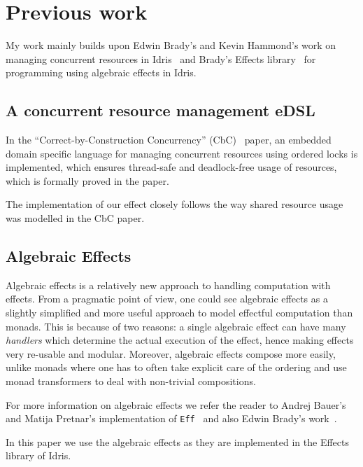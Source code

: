 \section{Previous work}

My work mainly builds upon Edwin Brady's and Kevin Hammond's work on managing
concurrent resources in Idris~\cite{cbconc-fi} and Brady's Effects
library~\cite{effects-idr} for programming using algebraic effects in Idris.

\subsection{A concurrent resource management eDSL}

In the ``Correct-by-Construction Concurrency'' (CbC)~\cite{cbconc-fi} paper, an
embedded domain specific language for managing concurrent resources using
ordered locks is implemented, which ensures thread-safe and deadlock-free usage
of resources, which is formally proved in the paper.

The implementation of our effect closely follows the way shared resource usage
was modelled in the CbC paper.

\subsection{Algebraic Effects}

Algebraic effects is a relatively new approach to handling computation with
effects. From a pragmatic point of view, one could see algebraic effects as a
slightly simplified and more useful approach to model effectful computation than
monads. This is because of two reasons: a single algebraic effect can have many
\emph{handlers} which determine the actual execution of the effect, hence
making effects very re-usable and modular. Moreover, algebraic effects compose
more easily, unlike monads where one has to often take explicit care of the
ordering and use monad transformers to deal with non-trivial compositions.

For more information on algebraic effects we refer the reader to Andrej Bauer's
and Matija Pretnar's implementation of \texttt{Eff}~\cite{eff} and also Edwin Brady's work~\cite{effects-idr}.

In this paper we use the algebraic effects as they are implemented in the
Effects library of Idris.
